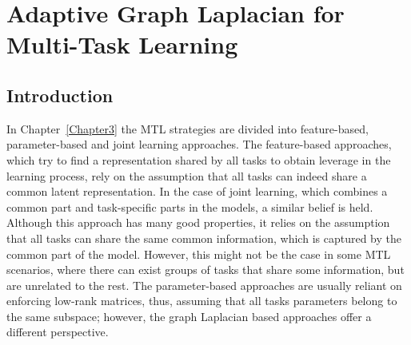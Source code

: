 
\chapter{Adaptive Graph Laplacian for Multi-Task Learning} %
\label{Chapter5}

{\bf \small{

}}

\section{Introduction}
In Chapter~\ref{Chapter3} the MTL strategies are divided into feature-based, parameter-based and joint learning approaches.
The feature-based approaches, which try to find a representation shared by all tasks to obtain leverage in the learning process, rely on the assumption that all tasks can indeed share a common latent representation.
In the case of joint learning, which combines a common part and task-specific parts in the models, a similar belief is held. Although this approach has many good properties, it relies on the assumption that all tasks can share the same common information, which is captured by the common part of the model.
However, this might not be the case in some MTL scenarios, where there can exist groups of tasks that share some information, but are unrelated to the rest.
The parameter-based approaches are usually reliant on enforcing low-rank matrices, thus, assuming that all tasks parameters belong to the same subspace; however, the graph Laplacian based approaches offer a different perspective.

